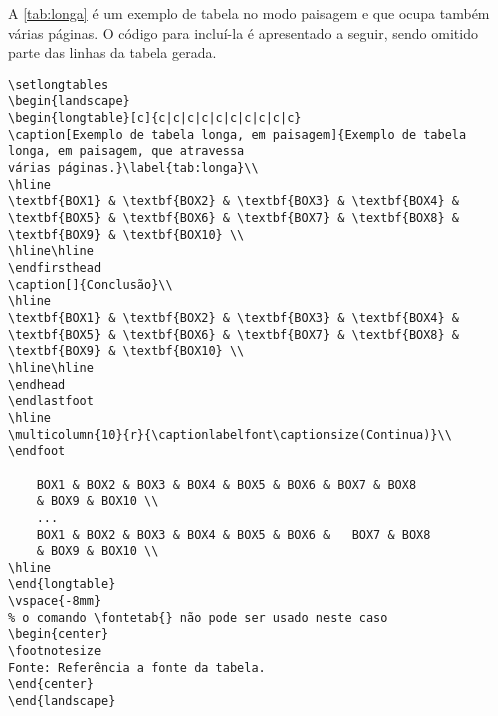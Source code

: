 A \autoref{tab:longa} é um exemplo de tabela no modo paisagem e que ocupa também várias páginas. O código para incluí-la é apresentado a seguir, sendo omitido parte das linhas da tabela gerada.

\begin{verbatim}
\setlongtables
\begin{landscape}
\begin{longtable}[c]{c|c|c|c|c|c|c|c|c|c}
\caption[Exemplo de tabela longa, em paisagem]{Exemplo de tabela longa, em paisagem, que atravessa 
várias páginas.}\label{tab:longa}\\
\hline
\textbf{BOX1} & \textbf{BOX2} & \textbf{BOX3} & \textbf{BOX4} & 
\textbf{BOX5} & \textbf{BOX6} & \textbf{BOX7} & \textbf{BOX8} & 
\textbf{BOX9} & \textbf{BOX10} \\
\hline\hline
\endfirsthead
\caption[]{Conclusão}\\
\hline
\textbf{BOX1} & \textbf{BOX2} & \textbf{BOX3} & \textbf{BOX4} & 
\textbf{BOX5} & \textbf{BOX6} & \textbf{BOX7} & \textbf{BOX8} & 
\textbf{BOX9} & \textbf{BOX10} \\
\hline\hline
\endhead
\endlastfoot
\hline
\multicolumn{10}{r}{\captionlabelfont\captionsize(Continua)}\\
\endfoot
	
	BOX1 & BOX2 & BOX3 & BOX4 & BOX5 & BOX6 & BOX7 & BOX8 
	& BOX9 & BOX10 \\
	...
	BOX1 & BOX2 & BOX3 & BOX4 & BOX5 & BOX6 &	BOX7 & BOX8 
	& BOX9 & BOX10 \\
\hline
\end{longtable}
\vspace{-8mm}
% o comando \fontetab{} não pode ser usado neste caso
\begin{center}
\footnotesize
Fonte: Referência a fonte da tabela.
\end{center}
\end{landscape}

\end{verbatim}

